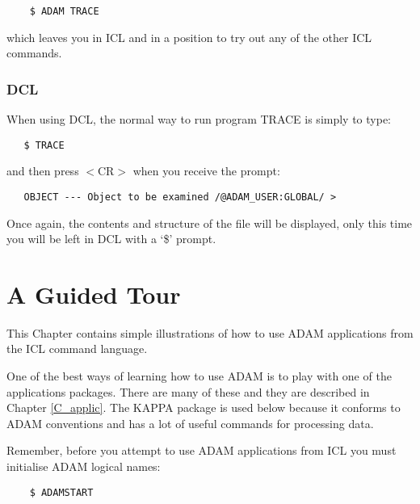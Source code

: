 \begin{small}
\begin{verbatim}
    $ ADAM TRACE
\end{verbatim}
\end{small}

which leaves you in ICL and in a position to try out any of the other ICL
commands.

\subsection{DCL}

When using DCL, the normal way to run program TRACE is simply to type:

\begin{small}
\begin{verbatim}
   $ TRACE
\end{verbatim}
\end{small}

and then press $<$CR$>$ when you receive the prompt:

\begin{small}
\begin{verbatim}
   OBJECT --- Object to be examined /@ADAM_USER:GLOBAL/ >
\end{verbatim}
\end{small}

Once again, the contents and structure of the file will be displayed, only this
time you will be left in DCL with a `\$' prompt.

\chapter {A Guided Tour}
\label{C_tour}

This Chapter contains simple illustrations of how to use ADAM applications from
the ICL command language.

One of the best ways of learning how to use ADAM is to play with one of the
applications packages.
There are many of these and they are described in Chapter \ref{C_applic}.
The KAPPA package is used below because it conforms to ADAM conventions and
has a lot of useful commands for processing data.

Remember, before you attempt to use ADAM applications from ICL you must
initialise ADAM logical names:

\begin{small}
\begin{verbatim}
    $ ADAMSTART
\end{verbatim}
\end{small}

